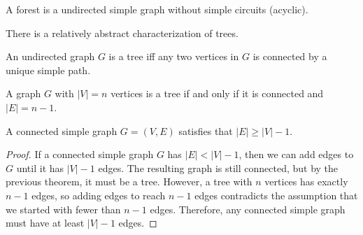 \documentclass[oneside]{book}
\begin{document}
\begin{definition}[Forests]
A forest is a undirected simple graph without simple circuits (acyclic).
\end{definition}

There is a relatively abstract characterization of trees.

\begin{theorem}
An undirected graph $G$ is a tree iff any two vertices in $G$ is connected by a unique simple path.
\end{theorem}

\begin{theorem}
A graph $G$ with $|V|=n$ vertices is a tree if and only if it is connected and $|E|=n-1$.
\end{theorem}

\begin{theorem}[Corollary]
A connected simple graph $G=(V,E)$ satisfies that $|E| \geq |V|-1$.
\end{theorem}

\begin{proof}
If a connected simple graph $G$ has $|E| < |V|-1$, then we can add edges to $G$ until it has $|V|-1$ edges. The resulting graph is still connected, but by the previous theorem, it must be a tree. However, a tree with $n$ vertices has exactly $n-1$ edges, so adding edges to reach $n-1$ edges contradicts the assumption that we started with fewer than $n-1$ edges. Therefore, any connected simple graph must have at least $|V|-1$ edges.
\end{proof}
\end{document}
